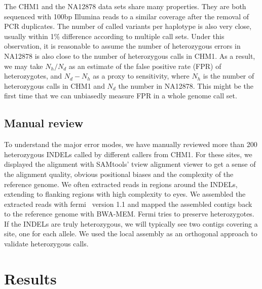 \documentclass{bioinfo}
\begin{document}
\begin{methods}
The CHM1 and the NA12878 data sets share many properties. They are both
sequenced with 100bp Illumina reads to a similar coverage after the removal of PCR
duplicates. The number of called variants per haplotype is also very close,
usually within 1\% difference according to multiple call sets. Under this
observation, it is reasonable to assume the number of heterozygous errors in
NA12878 is also close to the number of heterozygous calls in CHM1. As a result,
we may take $N_h/N_d$ as an estimate of the false positive rate (FPR) of
heterozygotes, and $N_d-N_h$ as a proxy to sensitivity, where $N_h$ is the
number of heterozygous calls in CHM1 and $N_d$ the number in NA12878. This
might be the first time that we can unbiasedly measure FPR
in a whole genome call set.

\subsection{Manual review}

To understand the major error modes, we have manually reviewed more than 200
heterozygous INDELs called by different callers from CHM1. For these sites,
we displayed the alignment with SAMtools' tview alignment viewer to get a sense
of the alignment quality, obvious positional biases and the complexity of the
reference genome. We often extracted reads in regions around the INDELs,
extending to flanking regions with high complexity to eyes. We assembled the
extracted reads with fermi~\citep{Li:2012fk} version 1.1 and mapped the
assembled contigs back to the reference genome with BWA-MEM. Fermi tries to
preserve heterozygotes. If the INDELs are truly heterozygous, we will typically
see two contigs covering a site, one for each allele. We used the local
assembly as an orthogonal approach to validate heterozygous calls.


\end{methods}

\section{Results}
\end{document}
